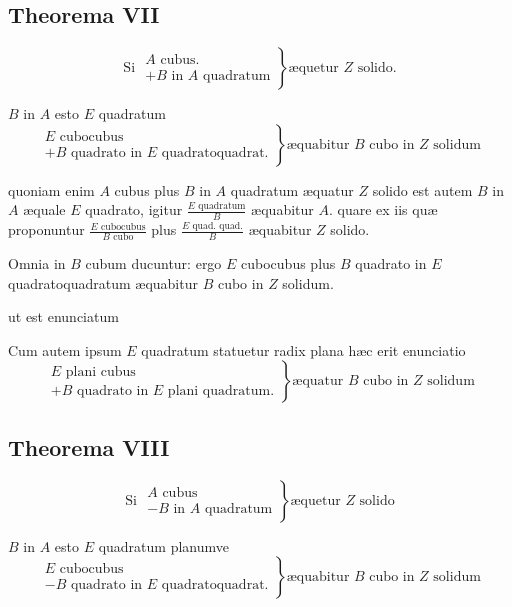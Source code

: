 \documentclass[11pt,a4paper]{article}
\begin{document}
\subsection*{Theorema VII}

\[ \text{Si } \left.\begin{array}{l} A \text{ cubus.} \\ + B \text{ in } A \text{ quadratum} \end{array}\right\} \text{æquetur } Z \text{ solido.} \]

$B$ in $A$ esto $E$ quadratum
\[ \left.\begin{array}{l} E \text{ cubocubus} \\ + B \text{ quadrato in } E \text{ quadratoquadrat.} \end{array}\right\} \text{æquabitur } B \text{ cubo in } Z \text{ solidum} \]

quoniam enim $A$ cubus plus $B$ in $A$ quadratum æquatur $Z$ solido est autem $B$ in $A$ æquale $E$ quadrato, igitur $\frac{E \text{ quadratum}}{B}$ æquabitur $A$. quare ex iis quæ proponuntur $\frac{E \text{ cubocubus}}{B \text{ cubo}}$ plus $\frac{E \text{ quad. quad.}}{B}$ æquabitur $Z$ solido.

Omnia in $B$ cubum ducuntur: ergo $E$ cubocubus plus $B$ quadrato in $E$ quadratoquadratum æquabitur $B$ cubo in $Z$ solidum.

ut est enunciatum

Cum autem ipsum $E$ quadratum statuetur radix plana hæc erit enunciatio
\[ \left.\begin{array}{l} E \text{ plani cubus} \\ + B \text{ quadrato in } E \text{ plani quadratum.} \end{array}\right\} \text{æquatur } B \text{ cubo in } Z \text{ solidum} \]

\subsection*{Theorema VIII}

\[ \text{Si } \left.\begin{array}{l} A \text{ cubus} \\ - B \text{ in } A \text{ quadratum} \end{array}\right\} \text{æquetur } Z \text{ solido} \]

$B$ in $A$ esto $E$ quadratum planumve
\[ \left.\begin{array}{l} E \text{ cubocubus} \\ - B \text{ quadrato in } E \text{ quadratoquadrat.} \end{array}\right\} \text{æquabitur } B \text{ cubo in } Z \text{ solidum} \]
\end{document}
